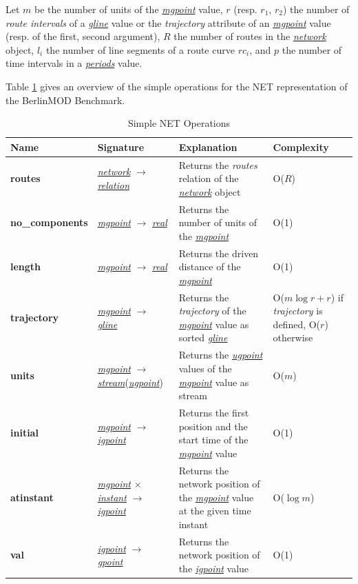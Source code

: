 \documentclass[a4paper]{article}
\newcommand{\bmodb} {BerlinMOD Benchmark}
\newcommand{\op}[1]{\textbf{#1}}
\newcommand{\dt}[1]{\textsl{\underline{#1}}}
\begin{document}
Let $m$ be the number of units of the \dt{mgpoint} value, $r$ (resp.
$r_1$, $r_2$) the number of \textit{route intervals} of a \dt{gline} value or
the \textit{trajectory} attribute of an \dt{mgpoint} value (resp. of the first, second
argument), $R$ the number of routes in the \dt{network} object, $l_i$ the
number of line segments of a route curve $rc_i$, and $p$ the number of time
intervals in a \dt{periods} value.

Table \ref{tab:simplenetoperations} gives an overview of the simple
operations for the NET representation of the \bmodb{}.
\begin{table}
  \caption{Simple NET Operations}
  \label{tab:simplenetoperations}
  \begin{center}
  \begin{tabularx}{1.0\textwidth}{|l|l|X|X|}
  \hline
  \textbf{Name}       & \textbf{Signature}                       & \textbf{Explanation}                         & \textbf{Complexity}\\
  \hline
  \op{routes  }       & \dt{network} $\rightarrow$ \dt{relation} & Returns the \textit{routes} relation of the \dt{network} object & O($R$)\\
  \hline
  \op{no\_components} & \dt{mgpoint} $\rightarrow$ \dt{real}     & Returns the number of units of the \dt{mgpoint}  & O(1)\\
  \hline
  \op{length}         & \dt{mgpoint} $\rightarrow$ \dt{real}     & Returns the driven distance of the \dt{mgpoint} & O(1)\\
  \hline
  \op{trajectory}     & \dt{mgpoint} $\rightarrow$ \dt{gline}    & Returns the \textit{trajectory} of the \dt{mgpoint} value as sorted \dt{gline} & O($m \log r + r$) if \textit{trajectory} is defined, O($r$) otherwise\\
  \hline
  \op{units}          & \dt{mgpoint} $\rightarrow$ \dt{stream}(\dt{ugpoint}) & Returns the \dt{ugpoint} values of the \dt{mgpoint} value as stream & O($m$)\\
  \hline
  \op{initial}        & \dt{mgpoint} $\rightarrow$ \dt{igpoint} & Returns the first position and the start time of the \dt{mgpoint} value & O(1)\\
  \hline
  \op{atinstant}      & \dt{mgpoint} $\times$ \dt{instant} $\rightarrow$ \dt{igpoint} & Returns the network position of the \dt{mgpoint} value at the given time instant & O($\log m$)\\
  \hline
  \op{val}            & \dt{igpoint} $\rightarrow$ \dt{gpoint}  & Returns the network position of the \dt{igpoint} value & O(1)\\

\end{tabularx}
\end{center}
\end{table}
\end{document}
